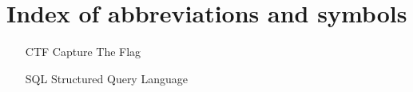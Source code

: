 
\chapter{Index of abbreviations and symbols}

\begin{itemize}
	\item[CTF] Capture The Flag
	\item[SQL] Structured Query Language
\end{itemize}
